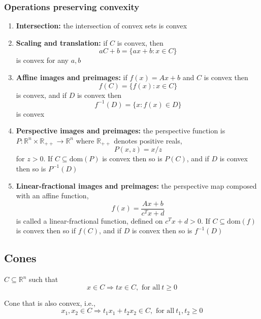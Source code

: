 \documentclass[a4paper]{article}
\begin{document}
{\subsubsection{Operations preserving convexity}
\begin{enumerate}
  \item \textbf{Intersection:} the intersection of convex sets is convex
  \item \textbf{Scaling and translation:} if $C$ is convex, then
  \[ 
    aC + b = \{ax+ b : x \in C\}
    \]
  is convex for any $a, b$
  \item \textbf{Affine images and preimages:} if $f(x) = Ax +b$ and $C$ is convex then 
  \begin{equation}
    f(C) = \{f(x) : x \in C\} \nonumber
  \end{equation}
  is convex, and if $D$ is convex then 
  \begin{equation}
    f^{-1}(D) = \{x: f(x) \in D\} \nonumber
  \end{equation}
  is convex
  \item \textbf{Perspective images and preimages:} the perspective function is $P : \mathbb{R}^n \times \mathbb{R}_{++} \rightarrow \mathbb{R}^n$ where $ \mathbb{R}_{++}$ denotes positive reals,
  \[ 
    P(x, z) = x / z
    \]
  for $ z > 0$. If $C \subseteq \text{dom}(P)$ is convex then so is $P(C)$, and if $D $ is convex then so is $P^{-1}(D)$
  \item  \textbf{Linear-fractional images and preimages:} the perspective map composed with an affine function,
  \[ 
    f(x) = \frac{Ax + b}{c^T x + d}
    \]
  is called a linear-fractional function, defined on $c^T x + d > 0$. If $C \subseteq \text{dom}(f)$ is convex then so if $f(C)$, and if $D$ is convex then so is $f^{-1}(D)$ 
\end{enumerate}

\subsection{Cones}
\begin{defi}[Cone]
  $C \subseteq \mathbb{R}^n$ such that  
  \[
    x \in C \Longrightarrow  tx \in C,\text{\ for\ all}\ t \geq 0 
  \]
\end{defi}

\begin{defi}
  Cone that is also convex, i.e.,
  \[
    x_1, x_2 \in C \Longrightarrow  t_1 x_1 + t_2 x_2 \in C,\text{\ for\ all}\ t_1, t_2 \geq 0 
  \]
\end{defi}

}
\end{document}
